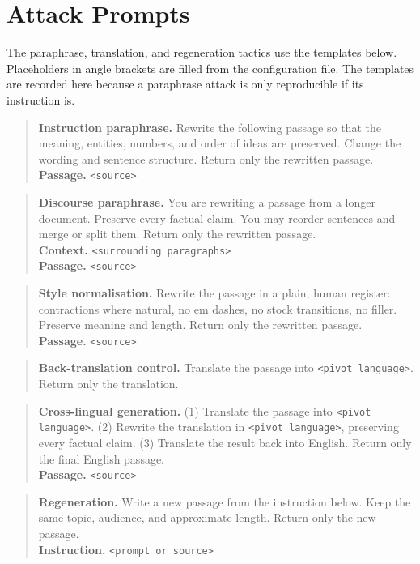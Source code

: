 \section{Attack Prompts}
\label{app:prompts}

The paraphrase, translation, and regeneration tactics use the templates below.
Placeholders in angle brackets are filled from the configuration file. The
templates are recorded here because a paraphrase attack is only reproducible if
its instruction is.

\begin{quote}
\small
\textbf{Instruction paraphrase.} Rewrite the following passage so that the meaning, entities, numbers, and order of ideas are preserved. Change the wording and sentence structure. Return only the rewritten passage.\\
\textbf{Passage.} \texttt{<source>}
\end{quote}

\begin{quote}
\small
\textbf{Discourse paraphrase.} You are rewriting a passage from a longer document. Preserve every factual claim. You may reorder sentences and merge or split them. Return only the rewritten passage.\\
\textbf{Context.} \texttt{<surrounding paragraphs>}\\
\textbf{Passage.} \texttt{<source>}
\end{quote}

\begin{quote}
\small
\textbf{Style normalisation.} Rewrite the passage in a plain, human register: contractions where natural, no em dashes, no stock transitions, no filler. Preserve meaning and length. Return only the rewritten passage.\\
\textbf{Passage.} \texttt{<source>}
\end{quote}

\begin{quote}
\small
\textbf{Back-translation control.} Translate the passage into \texttt{<pivot language>}. Return only the translation.
\end{quote}

\begin{quote}
\small
\textbf{Cross-lingual generation.} (1) Translate the passage into \texttt{<pivot language>}. (2) Rewrite the translation in \texttt{<pivot language>}, preserving every factual claim. (3) Translate the result back into English. Return only the final English passage.\\
\textbf{Passage.} \texttt{<source>}
\end{quote}

\begin{quote}
\small
\textbf{Regeneration.} Write a new passage from the instruction below. Keep the same topic, audience, and approximate length. Return only the new passage.\\
\textbf{Instruction.} \texttt{<prompt or source>}
\end{quote}
